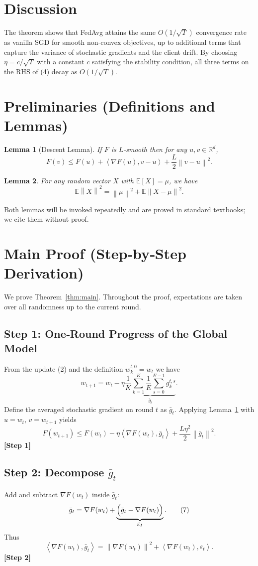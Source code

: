 \documentclass{article}
\newtheorem{lemma}{Lemma}
\newcommand{\EE}{\mathbb{E}}
\newcommand{\RR}{\mathbb{R}}
\newcommand{\norm}[1]{\left\|#1\right\|}
\newcommand{\inner}[2]{\left\langle #1,#2\right\rangle}
\newcommand{\grad}{\nabla}
\begin{document}
\section*{Discussion}
The theorem shows that FedAvg attains the same $O(1/\sqrt{T})$ convergence rate as vanilla SGD for smooth non‑convex objectives, up to additional terms that capture the variance of stochastic gradients and the client drift. By choosing $\eta = c/\sqrt{T}$ with a constant $c$ satisfying the stability condition, all three terms on the RHS of (4) decay as $O(1/\sqrt{T})$.

\newpage

\section*{Preliminaries (Definitions and Lemmas)}
\begin{lemma}[Descent Lemma]\label{lem:descent}
If $F$ is $L$‑smooth then for any $u,v\in\RR^d$,
\[
F(v)\le F(u)+\inner{\grad F(u)}{v-u}+\frac{L}{2}\norm{v-u}^{2}.
\]
\end{lemma}
\begin{lemma}\label{lem:variance}
For any random vector $X$ with $\EE[X]=\mu$, we have
\[
\EE\norm{X}^{2}= \norm{\mu}^{2}+ \EE\norm{X-\mu}^{2}.
\]
\end{lemma}
Both lemmas will be invoked repeatedly and are proved in standard textbooks; we cite them without proof.

\section*{Main Proof (Step‑by‑Step Derivation)}
We prove Theorem~\ref{thm:main}. Throughout the proof, expectations are taken over all randomness up to the current round.

\subsection*{Step 1: One‑Round Progress of the Global Model}
From the update (2) and the definition $w_{k}^{t,0}=w_t$ we have
\[
w_{t+1}=w_t-\eta\underbrace{\frac{1}{K}\sum_{k=1}^{K}\frac{1}{E}\sum_{s=0}^{E-1} g_{k}^{t,s}}_{\displaystyle \bar g_t } .
\tag{5}
\]
Define the averaged stochastic gradient on round $t$ as $\bar g_t$.
Applying Lemma~\ref{lem:descent} with $u=w_t$, $v=w_{t+1}$ yields
\[
F(w_{t+1})\le F(w_t)-\eta\inner{\grad F(w_t)}{\bar g_t}
+ \frac{L\eta^{2}}{2}\norm{\bar g_t}^{2}.
\tag{6}
\]
\textbf{[Step 1]}

\subsection*{Step 2: Decompose $\bar g_t$}
Add and subtract $\grad F(w_t)$ inside $\bar g_t$:
\[
\bar g_t = \grad F(w_t) + \underbrace{\Bigl(\bar g_t-\grad F(w_t)\Bigr)}_{\displaystyle \varepsilon_t } .
\tag{7}
\]
Thus
\[
\inner{\grad F(w_t)}{\bar g_t}
= \norm{\grad F(w_t)}^{2} + \inner{\grad F(w_t)}{\varepsilon_t } .
\tag{8}
\]
\textbf{[Step 2]}
\end{document}
